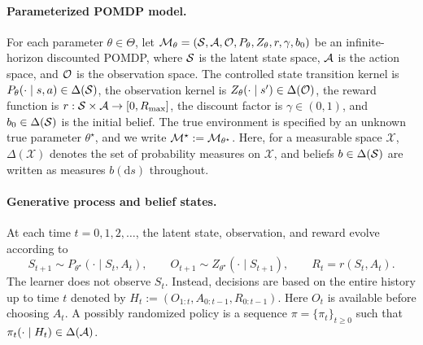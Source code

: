 
\paragraph{Parameterized POMDP model.}
For each parameter $\theta \in \Theta$, let $\mathcal M_{\theta} = ({\mathcal{S}},{\mathcal{A}},{\mathcal{O}}, P_{\theta}, Z_{\theta}, r,\gamma,b_0)$ be an infinite-horizon discounted POMDP, where ${\mathcal{S}}$ is the latent state space, ${\mathcal{A}}$ is the action space, and ${\mathcal{O}}$ is the observation space. The controlled state transition kernel is $P_{\theta}(\cdot \mid s,a) \in \Delta({\mathcal{S}})$, the observation kernel is $Z_{\theta}(\cdot \mid s') \in \Delta({\mathcal{O}})$, the reward function is $r:{\mathcal{S}}\times{\mathcal{A}}\to [0, R_{\max}]$, the discount factor is $\gamma\in(0,1)$, and $b_0\in\Delta({\mathcal{S}})$ is the initial belief. The true environment is specified by an unknown true parameter $\theta^\star$, and we write ${\mathcal{M}}^{\star} := {\mathcal{M}}_{\theta^\star}$. Here, for a measurable space $\mathcal X$, $\Delta(\mathcal X)$ denotes the set of probability measures on $\mathcal{X}$, and beliefs $b\in\Delta({\mathcal{S}})$ are written as measures $b(\mathrm ds)$ throughout.

\paragraph{Generative process and belief states.}
At each time $t=0,1,2,\ldots$, the latent state, observation, and reward evolve according to
\begin{equation}\label{eq:generative}
S_{t+1}\sim P_{\theta^\star}(\cdot \mid S_t,A_t),\qquad
O_{t+1}\sim Z_{\theta^\star}(\cdot \mid S_{t+1}),\qquad
R_t = r(S_t,A_t).
\end{equation}
The learner does not observe $S_t$. Instead, decisions are based on the entire history up to time $t$ denoted by $H_t := (O_{1:t},A_{0:t-1},R_{0:t-1})$. Here $O_t$ is available before choosing $A_t$. A possibly randomized policy is a sequence $\pi=\{\pi_t\}_{t\ge0}$ such that $\pi_t(\cdot \mid H_t)\in\Delta({\mathcal{A}})$.

